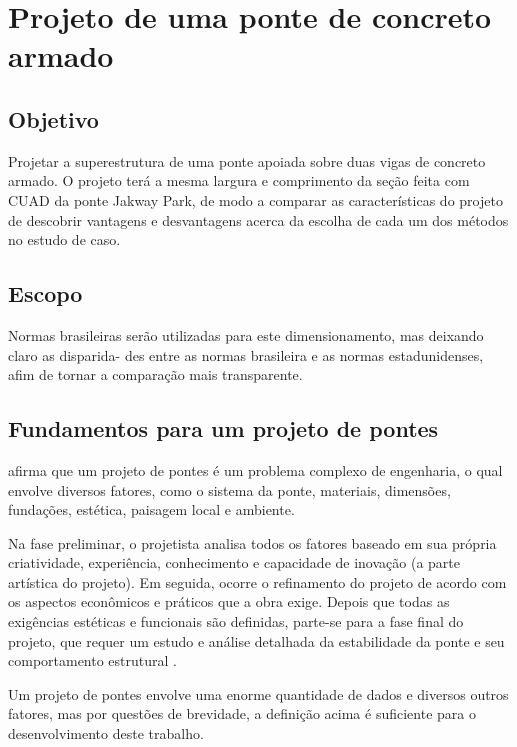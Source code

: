 \chapter{Projeto de uma ponte de concreto armado}

\section{Objetivo}

Projetar a superestrutura de uma ponte apoiada sobre duas vigas de concreto armado. O projeto
terá a mesma largura e comprimento da seção feita com CUAD da ponte Jakway Park, de modo a comparar
as características do projeto de descobrir vantagens e desvantagens acerca da escolha de cada um dos
métodos no estudo de caso.

\section{Escopo}

Normas brasileiras serão utilizadas para este dimensionamento, mas deixando claro as disparida-
des entre as normas brasileira e as normas estadunidenses, afim de tornar a comparação mais transparente.

\section{Fundamentos para um projeto de pontes}

 afirma que um projeto de pontes é um problema complexo
de engenharia, o qual envolve diversos fatores, como o sistema da ponte, materiais, dimensões, fundações,
estética, paisagem local e ambiente.

Na fase preliminar, o projetista analisa todos os fatores baseado em sua própria criatividade,
experiência, conhecimento e capacidade de inovação (a parte artística do projeto). Em seguida, ocorre o
refinamento do projeto de acordo com os aspectos econômicos e práticos que a obra exige. Depois que
todas as exigências estéticas e funcionais são definidas, parte-se para a fase final do projeto, que requer
um estudo e análise detalhada da estabilidade da ponte e seu comportamento estrutural \cite[p.~30]{Troitsky}.

Um projeto de pontes envolve uma enorme quantidade de dados e diversos outros fatores, mas
por questões de brevidade, a definição acima é suficiente para o desenvolvimento deste trabalho.


